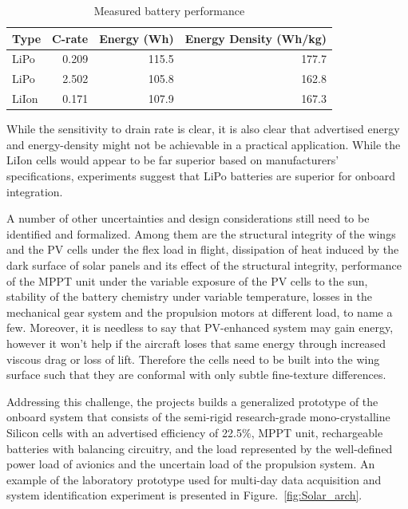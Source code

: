 \documentclass{ifacconf}
\begin{document}
\begin{table}
  \caption{Measured battery performance}
  \centering
  \begin{tabular}{ l | r | r | r }
  Type &C-rate & Energy (Wh) & Energy Density (Wh/kg) \\
  \hline
  LiPo & 0.209 & 115.5 & 177.7 \\
  LiPo & 2.502 & 105.8 & 162.8 \\
  LiIon & 0.171 & 107.9 & 167.3 \\
  \end{tabular}
  \label{Batt_performance}
\end{table}
While the sensitivity to drain rate is clear, it is also clear that advertised energy and
energy-density might not be achievable in a practical application. While the LiIon cells
would appear to be far superior based on manufacturers' specifications, experiments
suggest that LiPo batteries are superior for onboard integration.

A number of other uncertainties and design considerations still need to be identified and
formalized. Among them are the structural integrity of the wings and the PV cells under
the flex load in flight, dissipation of heat induced by the dark surface of solar panels
and its effect of the structural integrity,  performance of the MPPT unit under the
variable exposure of the PV cells to the sun, stability of the battery chemistry under
variable temperature, losses in the mechanical gear system and the propulsion motors at
different load, to name a few. Moreover, it is needless to say that PV-enhanced system
may gain energy, however it won't help if the aircraft loses that same energy through
increased viscous drag or loss of lift. Therefore the cells need to be built into the
wing surface such that they are conformal with only subtle fine-texture differences.
%

Addressing this challenge, the projects builds a generalized prototype of the onboard
system that consists of the semi-rigid research-grade mono-crystalline Silicon cells with
an advertised efficiency of 22.5$\%$, MPPT unit, rechargeable batteries with balancing
circuitry, and the load represented by the well-defined power load of avionics and the
uncertain load of the propulsion system. An example of the laboratory prototype used for
multi-day data acquisition and system identification experiment is presented in
Figure.~\ref{fig:Solar_arch}.
\end{document}
